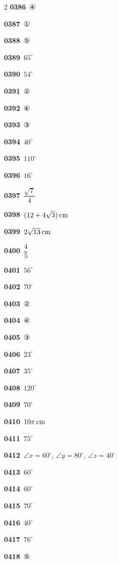 \documentclass[10pt,a4paper]{article}
\begin{document}
\begin{multicols}{2}
\noindent\textbf{0386}\ ④\par
\noindent\textbf{0387}\ ①\par
\noindent\textbf{0388}\ ⑤\par
\noindent\textbf{0389}\ $65^\circ$\par
\noindent\textbf{0390}\ $54^\circ$\par
\noindent\textbf{0391}\ ②\par
\noindent\textbf{0392}\ ④\par
\noindent\textbf{0393}\ ③\par
\noindent\textbf{0394}\ $40^\circ$\par
\noindent\textbf{0395}\ $110^\circ$\par
\noindent\textbf{0396}\ $16^\circ$\par
\noindent\textbf{0397}\ $\dfrac{\sqrt{7}}{4}$\par
\noindent\textbf{0398}\ $(12+4\sqrt{3})\mkern3mu \mathrm{cm}$\par
\noindent\textbf{0399}\ $2\sqrt{13}\mkern3mu \mathrm{cm}$\par
\noindent\textbf{0400}\ $\dfrac{4}{5}$\par
\noindent\textbf{0401}\ $56^\circ$\par
\noindent\textbf{0402}\ $70^\circ$\par
\noindent\textbf{0403}\ ②\par
\noindent\textbf{0404}\ ④\par
\noindent\textbf{0405}\ ③\par
\noindent\textbf{0406}\ $23^\circ$\par
\noindent\textbf{0407}\ $35^\circ$\par
\noindent\textbf{0408}\ $120^\circ$\par
\noindent\textbf{0409}\ $70^\circ$\par
\noindent\textbf{0410}\ $10\pi\mkern3mu \mathrm{cm}$\par
\noindent\textbf{0411}\ $75^\circ$\par
\noindent\textbf{0412}\ $\angle x=60^\circ$, $\angle y=80^\circ$, $\angle z=40^\circ$\par
\noindent\textbf{0413}\ $60^\circ$\par
\noindent\textbf{0414}\ $60^\circ$\par
\noindent\textbf{0415}\ $70^\circ$\par
\noindent\textbf{0416}\ $40^\circ$\par
\noindent\textbf{0417}\ $76^\circ$\par
\noindent\textbf{0418}\ ⑤\par

\end{multicols}
\end{document}
